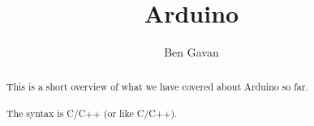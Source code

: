 \documentclass[]{article}
\title{Arduino}
\author{Ben Gavan}
\begin{document}
\maketitle

\begin{abstract}
This is a short overview of what we have covered about Arduino so far.
\\\\
The syntax is C/C++ (or like C/C++).
\end{abstract}

\section{}
\end{document}
